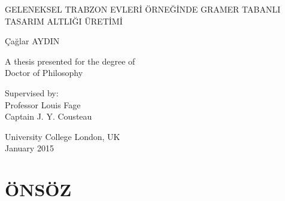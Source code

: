 \documentclass[12pt,turkish,a4paperpaper,]{report}
\date{}
\begin{document}
\begin{titlepage}
    \begin{center}


        \vspace*{2.5cm}

        \huge
        GELENEKSEL TRABZON EVLERİ ÖRNEĞİNDE GRAMER TABANLI TASARIM ALTLIĞI ÜRETİMİ

        \vspace{1.5cm}

        \Large
        Çağlar AYDIN

        \vspace{1.5cm}

        \normalsize
        A thesis presented for the degree of\\
        Doctor of Philosophy

        \vfill

        \normalsize
        Supervised by:\\
        Professor Louis Fage\\
        Captain J. Y. Cousteau

        \vspace{0.8cm}


        \normalsize
        University College London, UK\\
        January 2015


    \end{center}
\end{titlepage}

\hypertarget{uxf6nsuxf6z}{%
\chapter*{ÖNSÖZ}\label{uxf6nsuxf6z}}

\setcounter{page}{3}
\end{document}
